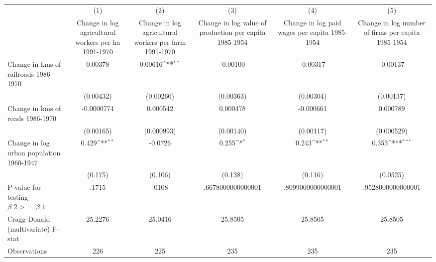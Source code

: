 {
\def\sym#1{\ifmmode^{#1}\else\(^{#1}\)\fi}
\begin{tabular}{l*{5}{c}}
\hline\hline
                &\multicolumn{1}{c}{(1)}&\multicolumn{1}{c}{(2)}&\multicolumn{1}{c}{(3)}&\multicolumn{1}{c}{(4)}&\multicolumn{1}{c}{(5)}\\
                &\multicolumn{1}{c}{Change in log agricultural workers per ha 1991-1970}&\multicolumn{1}{c}{Change in log agricultural workers per farm 1991-1970}&\multicolumn{1}{c}{Change in log value of production per capita 1985-1954}&\multicolumn{1}{c}{Change in log paid wages per capita 1985-1954}&\multicolumn{1}{c}{Change in log number of firms per capita 1985-1954}\\
\hline
Change in kms of railroads 1986-1970&  0.00378         &  0.00616\sym{**} & -0.00100         & -0.00317         & -0.00137         \\
                &(0.00432)         &(0.00260)         &(0.00363)         &(0.00304)         &(0.00137)         \\
[1em]
Change in kms of roads 1986-1970&-0.0000774         & 0.000542         & 0.000478         &-0.000661         & 0.000789         \\
                &(0.00165)         &(0.000993)         &(0.00140)         &(0.00117)         &(0.000529)         \\
[1em]
Change in log urban population 1960-1947&    0.429\sym{**} &  -0.0726         &    0.255\sym{*}  &    0.243\sym{**} &    0.353\sym{***}\\
                &  (0.175)         &  (0.106)         &  (0.138)         &  (0.116)         & (0.0525)         \\
\hline
P-value for testing $\beta\_{2} >= \beta\_{1}$&    .1715         &    .0108         &.6678000000000001         &.8099000000000001         &.9528000000000001         \\
Cragg-Donald (multivariate) F-stat&  25.2276         &  25.0416         &  25.8505         &  25.8505         &  25.8505         \\
Observations    &      226         &      225         &      235         &      235         &      235         \\
\hline\hline
\end{tabular}
}
